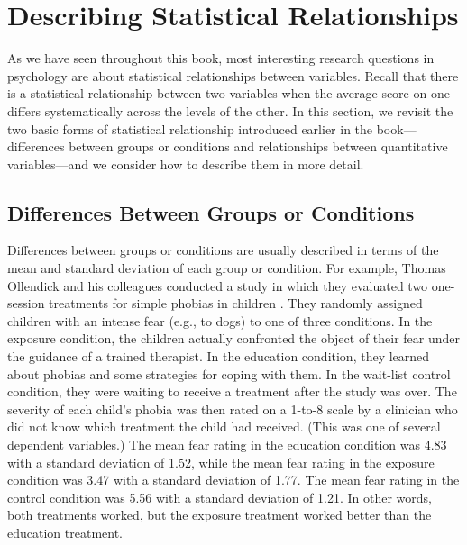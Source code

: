 \section{Describing Statistical Relationships}


As we have seen throughout this book, most interesting research questions in psychology are about statistical relationships between variables. Recall that there is a statistical relationship between two variables when the average score on one differs systematically across the levels of the other. In this section, we revisit the two basic forms of statistical relationship introduced earlier in the book---differences between groups or conditions and relationships between quantitative variables---and we consider how to describe them in more detail.


\subsection{Differences Between Groups or Conditions}

Differences between groups or conditions are usually described in terms of the mean and standard deviation of each group or condition. For example, Thomas Ollendick and his colleagues conducted a study in which they evaluated two one-session treatments for simple phobias in children \citep{ollendick_one-session_2009}. They randomly assigned children with an intense fear (e.g., to dogs) to one of three conditions. In the exposure condition, the children actually confronted the object of their fear under the guidance of a trained therapist. In the education condition, they learned about phobias and some strategies for coping with them. In the wait-list control condition, they were waiting to receive a treatment after the study was over. The severity of each child's phobia was then rated on a 1-to-8 scale by a clinician who did not know which treatment the child had received. (This was one of several dependent variables.) The mean fear rating in the education condition was 4.83 with a standard deviation of 1.52, while the mean fear rating in the exposure condition was 3.47 with a standard deviation of 1.77. The mean fear rating in the control condition was 5.56 with a standard deviation of 1.21. In other words, both treatments worked, but the exposure treatment worked better than the education treatment. 

